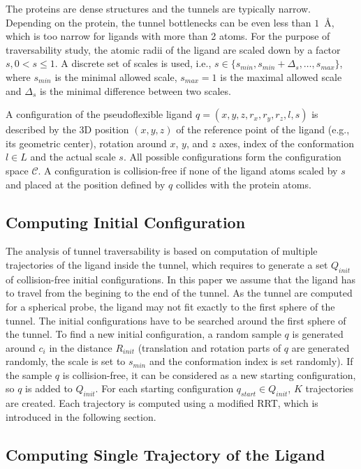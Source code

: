 \documentclass{svmult}
\def\qstart{q_{start}}
\def\qinit{\qstart}
\def\C{\mathcal{C}}
\def\CFD{{\mathcal{C}^s_{free}}}
\def\QI{Q_{init}}
\def\RI{R_{init}}
\def\smin{s_{min}}
\def\smax{s_{max}}
\def\sdelta{{\Delta}_s}
\def\L{L}
\begin{document}
The proteins are dense structures and the tunnels are typically narrow.
Depending on the protein, the tunnel bottlenecks can be even less than $1$~\AA, which is too narrow for ligands with more than 2 atoms.
For the purpose of traversability study, the atomic radii of the ligand are scaled down by a factor $s, 0 < s \le 1$.
A discrete set of scales is used, i.e., $s \in \{\smin, \smin+\sdelta, \ldots, \smax\}$, where 
$\smin$ is the minimal allowed scale, $\smax=1$ is the maximal allowed scale and $\sdelta$ is the minimal difference between two scales.

A configuration of the pseudoflexible ligand $q=(x,y,z,r_x,r_y,r_z,l,s)$  is described
by the 3D position $(x,y,z)$ of the reference point of the ligand (e.g., its geometric center), rotation around $x$, $y$, and $z$ axes,
index of the conformation $l\in \L$ and the actual scale $s$.
All possible configurations form the configuration space $\C$. 
A configuration is collision-free if none of the ligand atoms scaled by $s$ and placed at the
position defined by $q$ collides with the protein atoms.


\subsection{Computing Initial Configuration}

The analysis of tunnel traversability is based on computation of multiple trajectories of the ligand inside the tunnel, which
requires to generate a set $\QI$ of collision-free initial configurations.
In this paper we assume that the ligand has to travel from the begining to the end of the tunnel.
As the tunnel are computed for a spherical probe, the ligand may not fit exactly to the first sphere of the tunnel.
The initial configurations have to be searched around the first sphere of the tunnel.
To find a new initial configuration, a random sample $q$ is generated around $c_i$ in the distance $\RI$ (translation and rotation
 parts of $q$ are generated randomly, the scale is set to $\smin$ and the conformation index is set randomly).
If the sample $q$ is collision-free, it can be considered as a new starting configuration, so $q$ is added to $\QI$.
For each starting configuration $\qinit \in \QI$,  $K$ trajectories are created.
Each trajectory is computed using a modified RRT, which is introduced in the following section.


\subsection{Computing Single Trajectory of the Ligand}
\end{document}

